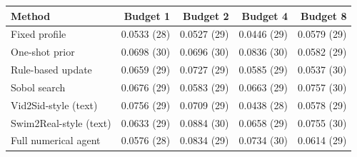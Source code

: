 \begin{tabular}{lrrrr}
\toprule
Method & Budget 1 & Budget 2 & Budget 4 & Budget 8 \\
\midrule
Fixed profile & 0.0533 (28) & 0.0527 (29) & 0.0446 (29) & 0.0579 (29) \\
One-shot prior & 0.0698 (30) & 0.0696 (30) & 0.0836 (30) & 0.0582 (29) \\
Rule-based update & 0.0659 (29) & 0.0727 (29) & 0.0585 (29) & 0.0537 (30) \\
Sobol search & 0.0676 (29) & 0.0583 (29) & 0.0663 (29) & 0.0757 (30) \\
Vid2Sid-style (text) & 0.0756 (29) & 0.0709 (29) & 0.0438 (28) & 0.0578 (29) \\
Swim2Real-style (text) & 0.0633 (29) & 0.0884 (30) & 0.0658 (29) & 0.0755 (30) \\
Full numerical agent & 0.0576 (28) & 0.0834 (29) & 0.0734 (30) & 0.0614 (29) \\
\bottomrule
\end{tabular}
